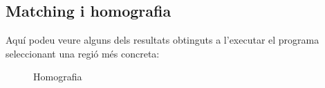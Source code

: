 	\subsection{Matching i homografia}
		Aquí podeu veure alguns dels resultats obtinguts a l'executar el programa seleccionant una regió més concreta:\\
		\begin{figure}[!htb]
		\end{figure}

		\begin{figure}[!htb]
			\caption{Homografia}
		\end{figure}
